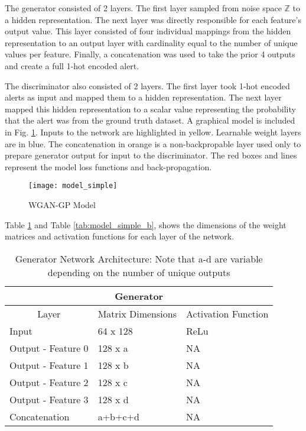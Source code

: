 The generator consisted of 2 layers. The first layer sampled from noise space $\mathbb{Z}$ to a hidden representation. The next layer was directly responsible for each feature's output value. This layer consisted of four individual mappings from the hidden representation to an output layer with cardinality equal to the number of unique values per feature. Finally, a concatenation was used to take the prior 4 outputs and create a full 1-hot encoded alert. 

The discriminator also consisted of 2 layers. The first layer took 1-hot encoded alerts as input and mapped them to a hidden representation. The next layer mapped this hidden representation to a scalar value representing the probability that the alert was from the ground truth dataset. A graphical model is included in Fig. \ref{fig:model_simple}. Inputs to the network are highlighted in yellow. Learnable weight layers are in blue. The concatenation in orange is a non-backpropable layer used only to prepare generator output for input to the discriminator. The red boxes and lines represent the model loss functions and back-propagation.

\begin{figure}[!htbp]
	\centering%
	\texttt{[image: model\_simple]}
	\caption{WGAN-GP Model}
	\label{fig:model_simple}
\end{figure}

Table \ref{tab:model_simple_a} and Table \ref{tab:model_simple_b}, shows the dimensions of the weight matrices and activation functions for each layer of the network.


\begin{table}[!htbp]
	\centering
	\caption{Generator Network Architecture: Note that a-d are variable depending on the number of unique outputs}
	\label{tab:model_simple_a}
	\begin{tabular}{l|l|l}
		\hline
		\multicolumn{3}{c}{\textbf{Generator}} \\ 
		\hline
		\multicolumn{1}{c|}{Layer} & \multicolumn{1}{c|}{Matrix Dimensions} & \multicolumn{1}{c}{Activation Function} \\ \hline
		Input & 64 x 128 & ReLu \\
		Output - Feature 0 & 128 x a & NA \\
		Output - Feature 1 & 128 x b & NA \\
		Output - Feature 2 & 128 x c & NA \\
		Output  - Feature 3 & 128 x d & NA \\
		Concatenation & a+b+c+d & NA \\
		\hline
	\end{tabular}
\end{table}

